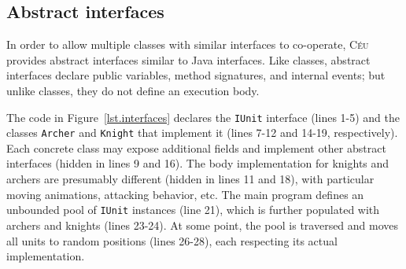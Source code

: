 \documentclass[preprint]{sigplanconf}
\newcommand{\CEU}{\textsc{C\'{e}u}\xspace}
\newcommand{\code}[1] {{\small{\texttt{#1}}}}
\newcommand{\1}{\;}
\newcommand{\2}{\;\;}
\newcommand{\3}{\;\;\;}
\newcommand{\5}{\;\;\;\;\;}
\begin{document}

\subsection{Abstract interfaces}

In order to allow multiple classes with similar interfaces to co-operate, \CEU 
provides abstract interfaces similar to Java interfaces.
%
Like classes, abstract interfaces declare public variables, method signatures, 
and internal events; but unlike classes, they do not define an execution body.

The code in Figure~\ref{lst.interfaces} declares the \code{IUnit} interface 
(lines 1-5) and the classes \code{Archer} and \code{Knight} that implement it 
(lines 7-12 and 14-19, respectively).
%
Each concrete class may expose additional fields and implement other abstract 
interfaces (hidden in lines 9 and 16).
%
The body implementation for knights and archers are presumably different 
(hidden in lines 11 and 18), with particular moving animations, attacking 
behavior, etc.
%
The main program defines an unbounded pool of \code{IUnit} instances (line 21), 
which is further populated with archers and knights (lines 23-24).
At some point, the pool is traversed and moves all units to random positions 
(lines 26-28), each respecting its actual implementation.
\end{document}
